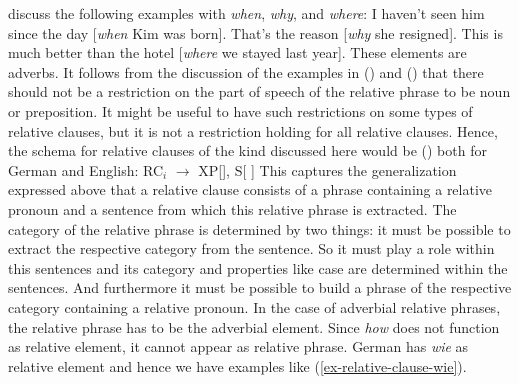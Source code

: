 \noindent
\citet[]{HPP2002a-u} discuss the following examples with \emph{when}, \emph{why}, and \emph{where}:
\eal
\ex I haven't seen him since the day [\emph{when} Kim was born].
\ex That's the reason [\emph{why} she resigned].
\ex This is much better than the hotel [\emph{where} we stayed last year].
\zl
These elements are adverbs. It follows from the discussion of the examples in () and
() that there should not be a restriction on the part of speech of the relative phrase to be
noun or preposition. It might be useful to have such restrictions on some types of relative clauses,
but it is not a restriction holding for all relative clauses. Hence, the schema for relative clauses
of the kind discussed here would be () both for German and English:
\ea
RC$_i$ $\to$ XP[\rel {}], S[\slasch {} ]
\z
This captures the generalization expressed above that a relative clause consists of a phrase
containing a relative pronoun and a sentence from which this relative phrase is extracted. The
category of the relative phrase is determined by two things: it must be possible to extract the
respective category from the sentence. So it must play a role within this sentences and its category
and properties like case are determined within the sentences. And furthermore it must be possible to
build a phrase of the respective category containing a relative pronoun. In the case of adverbial
relative phrases, the relative phrase has to be the adverbial element. Since \emph{how} does not
function as relative element, it cannot appear as relative phrase. German has \emph{wie} as relative
element and hence we have examples like (\ref{ex-relative-clause-wie}). 


\bigskip
{}


